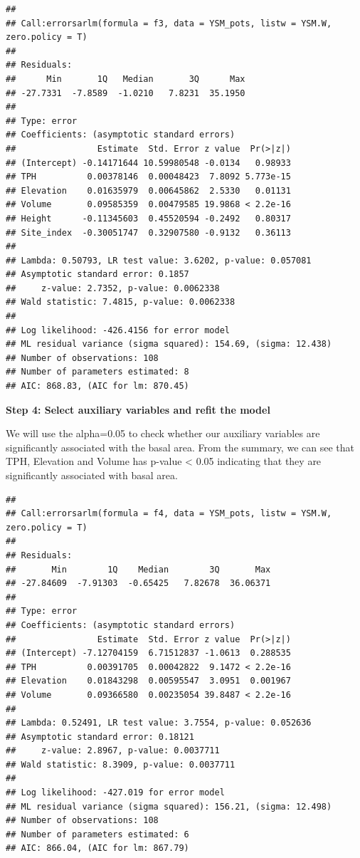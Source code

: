 \documentclass[
]{book}
\begin{document}
\begin{verbatim}
## 
## Call:errorsarlm(formula = f3, data = YSM_pots, listw = YSM.W, zero.policy = T)
## 
## Residuals:
##      Min       1Q   Median       3Q      Max 
## -27.7331  -7.8589  -1.0210   7.8231  35.1950 
## 
## Type: error 
## Coefficients: (asymptotic standard errors) 
##                Estimate  Std. Error z value  Pr(>|z|)
## (Intercept) -0.14171644 10.59980548 -0.0134   0.98933
## TPH          0.00378146  0.00048423  7.8092 5.773e-15
## Elevation    0.01635979  0.00645862  2.5330   0.01131
## Volume       0.09585359  0.00479585 19.9868 < 2.2e-16
## Height      -0.11345603  0.45520594 -0.2492   0.80317
## Site_index  -0.30051747  0.32907580 -0.9132   0.36113
## 
## Lambda: 0.50793, LR test value: 3.6202, p-value: 0.057081
## Asymptotic standard error: 0.1857
##     z-value: 2.7352, p-value: 0.0062338
## Wald statistic: 7.4815, p-value: 0.0062338
## 
## Log likelihood: -426.4156 for error model
## ML residual variance (sigma squared): 154.69, (sigma: 12.438)
## Number of observations: 108 
## Number of parameters estimated: 8 
## AIC: 868.83, (AIC for lm: 870.45)
\end{verbatim}

\textbf{Step 4: Select auxiliary variables and refit the model}

We will use the alpha=0.05 to check whether our auxiliary variables are significantly associated with the basal area. From the summary, we can see that TPH, Elevation and Volume has p-value \textless{} 0.05 indicating that they are significantly associated with basal area.

\begin{verbatim}
## 
## Call:errorsarlm(formula = f4, data = YSM_pots, listw = YSM.W, zero.policy = T)
## 
## Residuals:
##       Min        1Q    Median        3Q       Max 
## -27.84609  -7.91303  -0.65425   7.82678  36.06371 
## 
## Type: error 
## Coefficients: (asymptotic standard errors) 
##                Estimate  Std. Error z value  Pr(>|z|)
## (Intercept) -7.12704159  6.71512837 -1.0613  0.288535
## TPH          0.00391705  0.00042822  9.1472 < 2.2e-16
## Elevation    0.01843298  0.00595547  3.0951  0.001967
## Volume       0.09366580  0.00235054 39.8487 < 2.2e-16
## 
## Lambda: 0.52491, LR test value: 3.7554, p-value: 0.052636
## Asymptotic standard error: 0.18121
##     z-value: 2.8967, p-value: 0.0037711
## Wald statistic: 8.3909, p-value: 0.0037711
## 
## Log likelihood: -427.019 for error model
## ML residual variance (sigma squared): 156.21, (sigma: 12.498)
## Number of observations: 108 
## Number of parameters estimated: 6 
## AIC: 866.04, (AIC for lm: 867.79)
\end{verbatim}
\end{document}
